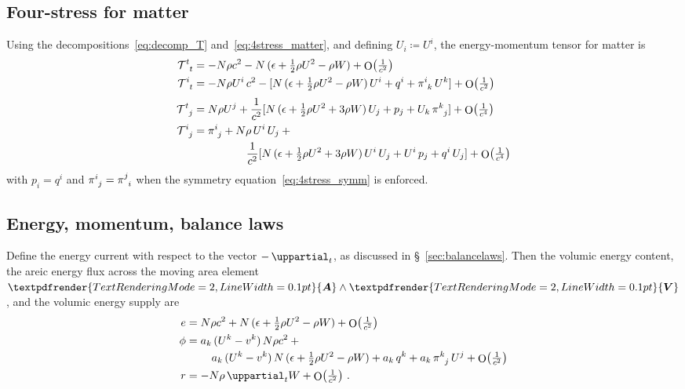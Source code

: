 \documentclass[\ifafour a4paper,12pt,\else a5paper,10pt,\fi%
onecolumn,oneside,article,%
british%
]{memoir}
\theoremstyle{remark}
\theoremstyle{innote}
\renewcommand*{\bm}[1]{\textpdfrender{TextRenderingMode=2,LineWidth=0.1pt}{\boldsymbol{#1}}}
\newcommand*{\de}{\mathop{}\!\uppartial}%
\DeclareMathOperator{\Ord}{O}%
\newcommand*{\defd}{\coloneqq}
\renewcommand*{\|}[1][]{\nonscript\:#1\vert\nonscript\:\mathopen{}}
\newcommand*{\sect}{\S}%
\newcommand*{\cf}{{cf.}}
\renewcommand*{\i}{{}\indices}
\newcommand*{\se}[1]{\de_{#1}}
\newcommand*{\yT}{\mathcal{T}}
\newcommand*{\ye}{e}
\newcommand*{\yW}{W}
\newcommand*{\Oc}[1]{\Ord\bigl(\tfrac{1}{c^{#1}}\bigr)}
\begin{document}
\subsection{Four-stress for matter}
\label{sec:GCRS_fourstress}

Using the decompositions~\eqref{eq:decomp_T} and~\eqref{eq:4stress_matter}, and defining $U_{i}\defd U^{i}$, the energy-momentum tensor for matter is \autocites[\cf][\sect\,8.1.2, where it is assumed that there's no heat flux and that the 3-stress is isotropic]{poissonetal2014}
\begin{equation}
  \label{eq:fourstress_matter_GCRS}
  \begin{aligned}
    \yT\i{^{t}_{t}} &=
    - N\rho c^{2} -N\,(\epsilon + \tfrac12 \rho U^{2} - \rho\yW) + \Oc{2}
    \\
    \yT\i{^{i}_{t}} &=
    -  N\rho U^{i}\, c^{2} -
    [N\,(\epsilon + \tfrac12\rho U^{2} -\rho\yW)\,U^{i} +
    q^{i} + \pi\i{^{i}_{k}}\,U^{k}] + \Oc{2}
    \\[\jot]
    \yT\i{^{t}_{j}} &=
    N\rho U^{j} + \frac{1}{c^{2}} [
    N\,(\epsilon + \tfrac12 \rho U^{2} + 3\rho\yW)\,U_{j} +
    p_{j} + U_{k}\,\pi\i{^{k}_{j}} ] + \Oc{4}
    \\
    \yT\i{^{i}_{j}} &=
    \!\begin{multlined}[t][0.8\linewidth]
      \pi\i{^{i}_{j}} + N\rho \,U^{i}\,U_{j} + {}\\
      \frac{1}{c^{2}} [
      N\,(\epsilon + \tfrac12 \rho U^{2} + 3\rho\yW)\,U^{i}\,U_{j} +
      U^{i}\,p_{j} + q^{i}\,U_{j}] + \Oc{4}
    \end{multlined}
  \end{aligned}
\end{equation}
with $p_{i}=q^{i}$ and $\pi\i{^{i}_{j}}=\pi\i{^{j}_{i}}$ when the symmetry equation~\eqref{eq:4stress_symm} is enforced.


\subsection{Energy, momentum, balance laws}
\label{sec:GCRS_energy_momentum}

Define the energy current with respect to the vector $-\se{t}$, as discussed in \sect~\ref{sec:balancelaws}. Then the volumic energy content, the areic energy flux across the moving area element $\bm{A}\land\bm{V}$, and the volumic energy supply are
\begin{equation}
  \label{eq:energy_matter_GCRS}
  \begin{aligned}
    \ye &=
    N\rho c^{2} + N\,(\epsilon + \tfrac12 \rho U^{2} - \rho\yW) + \Oc{2}
    \\
    \phi &=
    \!\begin{multlined}[t][0.8\linewidth]
      a_{k}\,(U^{k}-v^{k})\,N\rho c^{2} +{}\\
      a_{k}\,(U^{k}-v^{k})\,N\,(\epsilon + \tfrac12 \rho U^{2} - \rho\yW) +
      a_{k}\,q^{k} + a_{k}\,\pi\i{^{k}_{j}}\,U^{j} +
      \Oc{2}
    \end{multlined}
    \\
    r &= - N\rho\de_{t}\yW + \Oc{2} \ .
  \end{aligned}
\end{equation}
\end{document}
